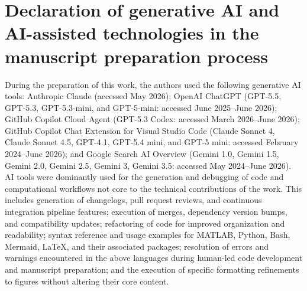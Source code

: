 \documentclass[a4paper,fleqn,colorlinks,unicode,hypertexnames=false]{cas-dc}
\begin{document}
\section*{Declaration of generative AI and AI-assisted technologies in the manuscript preparation process}
During the preparation of this work, the authors used the following generative AI tools:
Anthropic Claude (accessed May 2026);
OpenAI ChatGPT (GPT-5.5, GPT-5.3, GPT-5.3-mini, and GPT-5-mini: accessed June 2025--June 2026);
GitHub Copilot Cloud Agent (GPT-5.3 Codex: accessed March 2026--June 2026);
GitHub Copilot Chat Extension for Visual Studio Code (Claude Sonnet 4, Claude Sonnet 4.5, GPT-4.1, GPT-5.4 mini, and GPT-5 mini: accessed February 2024--June 2026); and
Google Search AI Overview (Gemini 1.0, Gemini 1.5, Gemini 2.0, Gemini 2.5, Gemini 3, Gemini 3.5: accessed May 2024--June 2026).
AI tools were dominantly used for the generation and debugging of code and computational workflows not core to the technical contributions of the work.
This includes generation of changelogs, pull request reviews, and continuous integration pipeline features;
execution of merges, dependency version bumps, and compatibility updates;
refactoring of code for improved organization and readability;
syntax reference and usage examples for MATLAB, Python, Bash, Mermaid, \LaTeX, and their associated packages;
resolution of errors and warnings encountered in the above languages during human-led code development and manuscript preparation;
and the execution of specific formatting refinements to figures without altering their core content.
\end{document}
